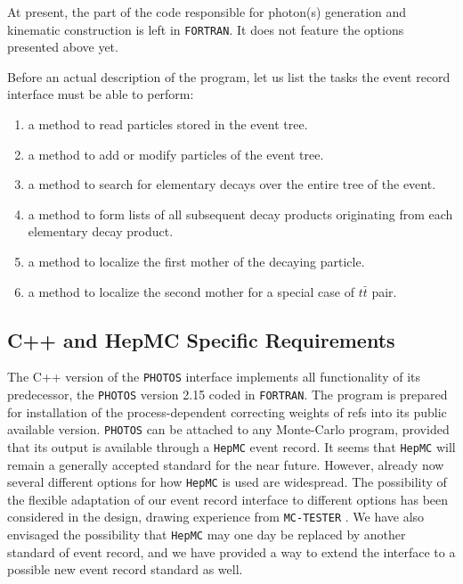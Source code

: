 \documentclass[]{Photos_interface_design}
\begin{document}
At present, the part of the code responsible for photon(s) generation and kinematic 
construction is left in  {\tt FORTRAN}. It does not feature the options presented above yet.


Before an actual description of the program, let us list the tasks the event record interface must be able to perform:
\begin{enumerate}
\item a method to read  particles stored in the event tree.
\item a method to add or modify particles of the event tree.
\item a method to search for elementary decays over the entire tree of the event.
\item a method to form lists of all subsequent decay products originating from each elementary decay product.
\item a method to localize the first mother of the decaying particle. 
\item a method to localize the second mother for a special case of $t \bar t$ pair.
\end{enumerate}


\subsection{C++ and HepMC Specific Requirements}

The C++ version of the {\tt PHOTOS} interface implements all functionality
of its predecessor, the {\tt PHOTOS} version 2.15 \cite{Golonka:2005pn} coded in {\tt FORTRAN}.
The program is prepared for installation of the process-dependent correcting weights of refs 
\cite{Golonka:2006tw,Nanava:2009vg} into its public available version. 
{\tt PHOTOS} can be attached to any Monte-Carlo program,
provided that its output is available through a {\tt HepMC} \cite{Dobbs:2001ck} event record.
It seems that {\tt HepMC} will
remain a generally accepted standard for the near future. However,
already now several different options for how {\tt HepMC} is used are
widespread. The possibility of the flexible  adaptation of our event record 
interface to different
options has been considered in the design,  drawing experience
from {\tt MC-TESTER} \cite{Davidson:2008ma,Golonka:2002rz}.
We have also
envisaged the possibility that {\tt HepMC} may one day be replaced by another
standard of event record, and we have provided a way to extend
the interface to a possible new event record standard as well.
\end{document}
